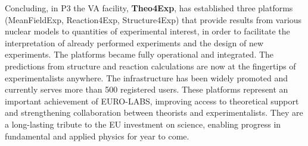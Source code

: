Concluding,  in P3 the VA facility, \textbf{Theo4Exp}, has established three platforms (MeanFieldExp, Reaction4Exp, Structure4Exp) that provide results from various nuclear models to quantities of experimental interest, in order to facilitate the interpretation of already performed experiments and the design of new experiments.  The platforms  became fully operational and integrated. The predictions from structure and reaction calculations are now at the fingertips of experimentalists anywhere. The infrastructure has been widely promoted and currently serves more than 500 registered users. These platforms represent an important achievement of EURO-LABS, improving access to theoretical support and strengthening collaboration between theorists and experimentalists. They are a long-lasting tribute to the EU investment on science, enabling progress in fundamental and applied physics for year to come. 

